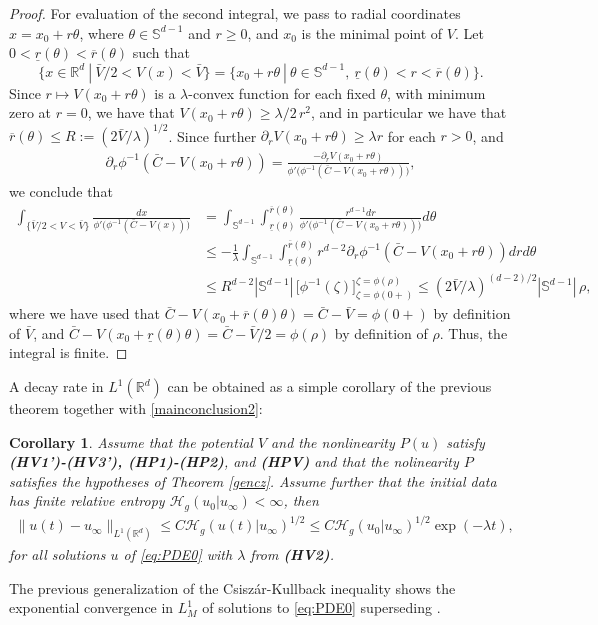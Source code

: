\documentclass[reqno]{amsart}
\newtheorem{corollary}[lemma]{Corollary}
\newcommand{\R}{\mathbb{R}}
\newcommand{\Rd}{{\R^d}}
\newcommand{\uinf}{u_\infty}
\begin{document}
\begin{proof}
    For evaluation of the second integral, we pass to radial coordinates $x=x_0+r\theta$, where $\theta\in{\mathbb S}^{d-1}$ and $r\ge0$, and $x_0$ is the minimal point of $V$. Let $0<\underline r(\theta)<\overline r(\theta)$ such that
    \[ \{x\in\Rd\ |\ \bar V/2< V(x) < \bar V\} = \{ x_0+r\theta\ |\ \theta\in\mathbb{S}^{d-1},\ \underline r(\theta)<r<\overline r(\theta) \}. \]
    Since $r\mapsto V(x_0+r\theta)$ is a $\lambda$-convex function for each fixed $\theta$, with minimum zero at $r=0$, we have that $V(x_0+r\theta)\ge \lambda/2\,r^2$, and in particular we have that $\overline r(\theta)\le R:=(2\bar V/\lambda)^{1/2}$. Since further $\partial_r V(x_0+r\theta)\ge\lambda r$ for each $r>0$, and
    \begin{align*}
        \partial_r\phi^{-1}(\bar C-V(x_0+r\theta)) = \frac{-\partial_rV(x_0+r\theta)}{\phi'\big(\phi^{-1}(\bar C-V(x_0+r\theta))\big)},
    \end{align*}
    we conclude that
    \begin{align*}
        \int_{\{ \bar V/2< V<\bar V\}}\frac{dx}{\phi'\big(\phi^{-1}(\bar C-V(x))\big)}
        &= \int_{{\mathbb S}^{d-1}} \int_{\underline r(\theta)}^{\overline r(\theta)} \frac{r^{d-1} dr}{\phi'\big(\phi^{-1}(\bar C-V(x_0+r\theta))\big)} d\theta\\
        &\le -\frac1\lambda\int_{{\mathbb S}^{d-1}} \int_{\underline r(\theta)}^{\overline r(\theta)} r^{d-2}\partial_r\phi^{-1}(\bar C-V(x_0+r\theta)) dr d\theta \\
        &\le R^{d-2}|\mathbb{S}^{d-1}|\,\big[\phi^{-1}(\zeta)\big]_{\zeta=\phi(0+)}^{\zeta=\phi(\rho)}
        \le (2\bar V/\lambda)^{(d-2)/2}|\mathbb{S}^{d-1}|\,\rho,
    \end{align*}     
    where we have used that $\bar C-V(x_0+\overline r(\theta)\theta)=\bar C-\bar V=\phi(0+)$ by definition of $\bar V$, and $\bar C-V(x_0+\underline r(\theta)\theta)=\bar C-\bar V/2=\phi(\rho)$ by definition of $\rho$. 
    Thus, the integral is finite.
\end{proof}

A decay rate in $L^1(\R^d)$ can be obtained as a simple corollary of the previous theorem together with \eqref{mainconclusion2}:

\begin{corollary}
    Assume that the potential $V$ and the nonlinearity $P(u)$ satisfy {\bf (HV1')-(HV3'), (HP1)-(HP2)}, and {\bf (HPV)} and that the nolinearity $P$ satisfies the hypotheses of Theorem \ref{gencz}. Assume further that the initial data has finite relative entropy ${\mathcal H}_g(u_0|u_\infty)<\infty$, then
    \begin{align*}%
        \|u(t)-\uinf\|_{L^1(\R^d)} \le C {\mathcal H}_g(u(t)|u_\infty)^{1/2} \leq C {\mathcal H}_g(u_0|u_\infty)^{1/2} \exp\left(-\lambda t\right),
    \end{align*}
    for all solutions $u$ of \eqref{eq:PDE0} with $\lambda$ from {\bf (HV2)}.
\end{corollary}
%
The previous generalization of the Csiszár-Kullback inequality shows the exponential convergence in $L^1_M$ of solutions to \eqref{eq:PDE0} superseding \cite[Theorem 31-32]{CJMTU}. 
\end{document}
